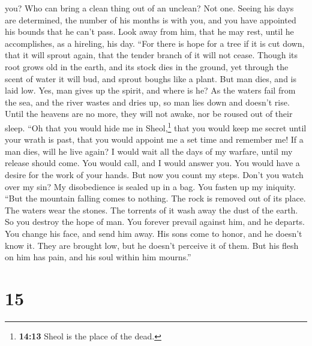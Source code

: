 you?  Who can bring a clean thing out of an unclean? Not
one.  Seeing his days are determined, the number of his
months is with you, and you have appointed his bounds that he can't
pass.  Look away from him, that he may rest, until he
accomplishes, as a hireling, his day.  ``For there is hope
for a tree if it is cut down, that it will sprout again, that the tender
branch of it will not cease.  Though its root grows old in
the earth, and its stock dies in the ground,  yet through
the scent of water it will bud, and sprout boughs like a plant.
 But man dies, and is laid low. Yes, man gives up the
spirit, and where is he?  As the waters fail from the
sea, and the river wastes and dries up,  so man lies down
and doesn't rise. Until the heavens are no more, they will not awake,
nor be roused out of their sleep.  ``Oh that you would
hide me in Sheol,\footnote{\textbf{14:13} Sheol is the place of the
  dead.} that you would keep me secret until your wrath is past, that
you would appoint me a set time and remember me!  If a
man dies, will he live again? I would wait all the days of my warfare,
until my release should come.  You would call, and I
would answer you. You would have a desire for the work of your hands.
 But now you count my steps. Don't you watch over my sin?
 My disobedience is sealed up in a bag. You fasten up my
iniquity.  ``But the mountain falling comes to nothing.
The rock is removed out of its place.  The waters wear
the stones. The torrents of it wash away the dust of the earth. So you
destroy the hope of man.  You forever prevail against
him, and he departs. You change his face, and send him away.
 His sons come to honor, and he doesn't know it. They are
brought low, but he doesn't perceive it of them.  But his
flesh on him has pain, and his soul within him mourns.''

\hypertarget{section-11}{%
\section{15}\label{section-11}}

